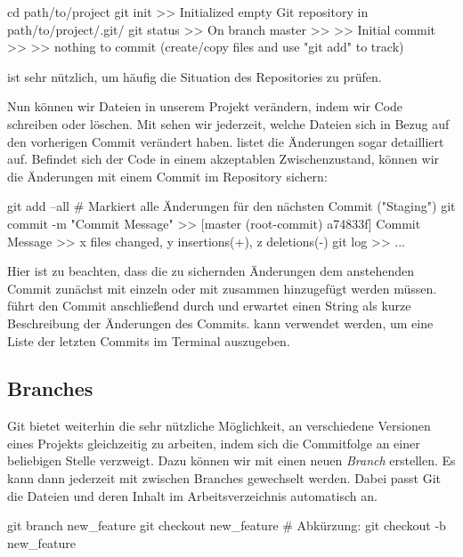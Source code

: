 \documentclass[parskip=half, final]{scrreprt}
\begin{document}
\begin{shcode}
cd path/to/project
git init
>> Initialized empty Git repository in path/to/project/.git/
git status
>> On branch master
>> 
>> Initial commit
>> 
>> nothing to commit (create/copy files and use "git add" to track)
\end{shcode}

 ist sehr nützlich, um häufig die Situation des Repositories zu prüfen.

Nun können wir Dateien in unserem Projekt verändern, indem wir Code schreiben oder löschen. Mit  sehen wir jederzeit, welche Dateien sich in Bezug auf den vorherigen Commit verändert haben.  listet die Änderungen sogar detailliert auf. Befindet sich der Code in einem akzeptablen Zwischenzustand, können wir die Änderungen mit einem Commit im Repository sichern:

\begin{shcode}
git add --all # Markiert alle Änderungen für den nächsten Commit ("Staging")
git commit -m "Commit Message"
>> [master (root-commit) a74833f] Commit Message
>>  x files changed, y insertions(+), z deletions(-)
git log
>> ...
\end{shcode}

Hier ist zu beachten, dass die zu sichernden Änderungen dem anstehenden Commit zunächst mit  einzeln oder mit  zusammen hinzugefügt werden müssen.  führt den Commit anschließend durch und erwartet einen String als kurze Beschreibung der Änderungen des Commits.  kann verwendet werden, um eine Liste der letzten Commits im Terminal auszugeben.


\subsection{Branches}

Git bietet weiterhin die sehr nützliche Möglichkeit, an verschiedene Versionen eines Projekts gleichzeitig zu arbeiten, indem sich die Commitfolge an einer beliebigen Stelle verzweigt. Dazu können wir mit  einen neuen \emph{Branch} erstellen. Es kann dann jederzeit mit  zwischen Branches gewechselt werden. Dabei passt Git die Dateien und deren Inhalt im Arbeitsverzeichnis automatisch an.

\begin{shcode}
git branch new_feature
git checkout new_feature
# Abkürzung:
git checkout -b new_feature
\end{shcode}
\end{document}
